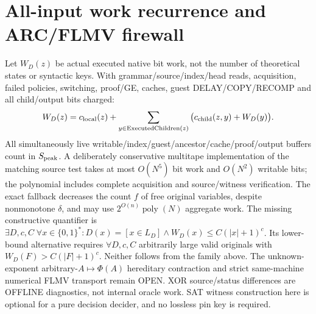 \documentclass[11pt]{article}
\begin{document}
\section{All-input work recurrence and ARC/FLMV firewall}
Let $W_D(z)$ be actual executed native bit work, not the number of theoretical states or syntactic keys. With grammar/source/index/head reads, acquisition, failed policies, switching, proof/GE, caches, guest DELAY/COPY/RECOMP and all child/output bits charged:
\[
W_D(z)=c_{\rm local}(z)+\sum_{y\in\mathrm{ExecutedChildren}(z)}
\big(c_{\rm child}(z,y)+W_D(y)\big).
\]
All simultaneously live writable/index/guest/ancestor/cache/proof/output buffers count in $S_{\rm peak}$. A deliberately conservative multitape implementation of the matching source test takes at most $O(N^5)$ bit work and $O(N^2)$ writable bits; the polynomial includes complete acquisition and source/witness verification. The exact fallback decreases the count $f$ of free original variables, despite nonmonotone $\delta$, and may use $2^{O(n)}\operatorname{poly}(N)$ aggregate work.
The missing constructive quantifier is $\exists D,c,C\;\forall x\in\{0,1\}^*:D(x)=[x\in L_D]\land W_D(x)\le C(|x|+1)^c$. Its lower-bound alternative requires $\forall D,c,C$ arbitrarily large valid originals with $W_D(F)>C(|F|+1)^c$. Neither follows from the family above. The unknown-exponent arbitrary-$A\mapsto\Phi(A)$ hereditary contraction and strict same-machine numerical FLMV transport remain OPEN. XOR source/status differences are OFFLINE diagnostics, not internal oracle work. SAT witness construction here is optional for a pure decision decider, and no lossless pin key is required.
\end{document}
